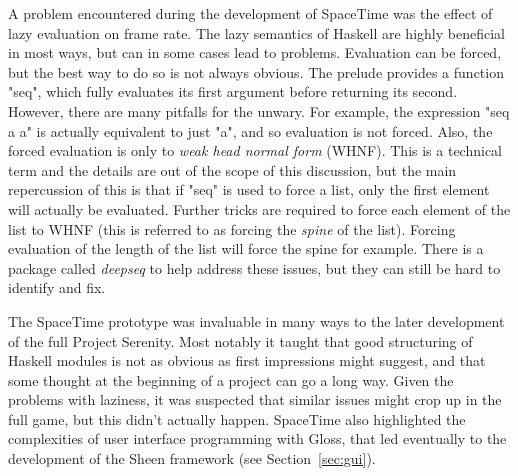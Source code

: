 A problem encountered during the development of SpaceTime was the effect of lazy evaluation on frame rate. The lazy semantics of Haskell are highly beneficial in most ways, but can in some cases lead to problems. Evaluation can be forced, but the best way to do so is not always obvious. The prelude provides a function "seq", which fully evaluates its first argument before returning its second. However, there are many pitfalls for the unwary. For example, the expression "seq a a" is actually equivalent to just "a", and so evaluation is not forced. Also, the forced evaluation is only to \emph{weak head normal form} (WHNF). This is a technical term and the details are out of the scope of this discussion, but the main repercussion of this is that if "seq" is used to force a list, only the first element will actually be evaluated. Further tricks are required to force each element of the list to WHNF (this is referred to as forcing the \emph{spine} of the list). Forcing evaluation of the length of the list will force the spine for example. There is a package called \emph{deepseq} to help address these issues, but they can still be hard to identify and fix.

The SpaceTime prototype was invaluable in many ways to the later development of the full Project Serenity. Most notably it taught that good structuring of Haskell modules is not as obvious as first impressions might suggest, and that some thought at the beginning of a project can go a long way. Given the problems with laziness, it was suspected that similar issues might crop up in the full game, but this didn't actually happen. SpaceTime also highlighted the complexities of user interface programming with Gloss, that led eventually to the development of the Sheen framework (see Section~\ref{sec:gui}).
